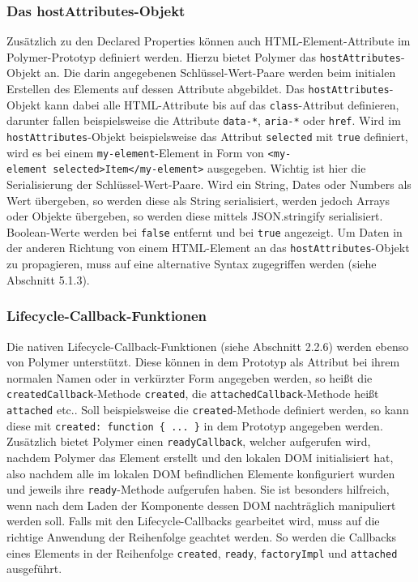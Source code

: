 \documentclass[]{article}
\begin{document}
\subsubsection{Das
hostAttributes-Objekt}\label{das-hostattributes-objekt}

Zusätzlich zu den Declared Properties können auch HTML-Element-Attribute
im Polymer-Prototyp definiert werden. Hierzu bietet Polymer das
\texttt{hostAttributes}-Objekt an. Die darin angegebenen
Schlüssel-Wert-Paare werden beim initialen Erstellen des Elements auf
dessen Attribute abgebildet. Das \texttt{hostAttributes}-Objekt kann
dabei alle HTML-Attribute bis auf das \texttt{class}-Attribut
definieren, darunter fallen beispielsweise die Attribute
\texttt{data-*}, \texttt{aria-*} oder \texttt{href}. Wird im
\texttt{hostAttributes}-Objekt beispielsweise das Attribut
\texttt{selected} mit \texttt{true} definiert, wird es bei einem
\texttt{my-element}-Element in Form von
\texttt{\textless{}my-element\ selected\textgreater{}Item\textless{}/my-element\textgreater{}}
ausgegeben. Wichtig ist hier die Serialisierung der
Schlüssel-Wert-Paare. Wird ein String, Dates oder Numbers als Wert
übergeben, so werden diese als String serialisiert, werden jedoch Arrays
oder Objekte übergeben, so werden diese mittels JSON.stringify
serialisiert. Boolean-Werte werden bei \texttt{false} entfernt und bei
\texttt{true} angezeigt. Um Daten in der anderen Richtung von einem
HTML-Element an das \texttt{hostAttributes}-Objekt zu propagieren, muss
auf eine alternative Syntax zugegriffen werden (siehe Abschnitt 5.1.3).

\subsubsection{Lifecycle-Callback-Funktionen}\label{lifecycle-callback-funktionen}

Die nativen Lifecycle-Callback-Funktionen (siehe Abschnitt 2.2.6) werden
ebenso von Polymer unterstützt. Diese können in dem Prototyp als
Attribut bei ihrem normalen Namen oder in verkürzter Form angegeben
werden, so heißt die \texttt{createdCallback}-Methode \texttt{created},
die \texttt{attachedCallback}-Methode heißt \texttt{attached} etc.. Soll
beispielsweise die \texttt{created}-Methode definiert werden, so kann
diese mit \texttt{created:\ function\ \{\ ...\ \}} in dem Prototyp
angegeben werden. Zusätzlich bietet Polymer einen
\texttt{readyCallback}, welcher aufgerufen wird, nachdem Polymer das
Element erstellt und den lokalen DOM initialisiert hat, also nachdem
alle im lokalen DOM befindlichen Elemente konfiguriert wurden und
jeweils ihre \texttt{ready}-Methode aufgerufen haben. Sie ist besonders
hilfreich, wenn nach dem Laden der Komponente dessen DOM nachträglich
manipuliert werden soll. Falls mit den Lifecycle-Callbacks gearbeitet
wird, muss auf die richtige Anwendung der Reihenfolge geachtet werden.
So werden die Callbacks eines Elements in der Reihenfolge
\texttt{created}, \texttt{ready}, \texttt{factoryImpl} und
\texttt{attached} ausgeführt.
\end{document}
